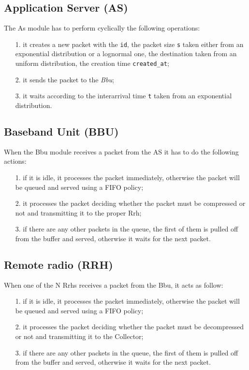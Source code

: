 \documentclass[11pt,a4paper,oneside, openright]{article}
\begin{document}
\subsection{Application Server (AS)}
The As module has to perform cyclically the following operations:
\begin{itemize}
    \item[1.] it creates a new packet with the \texttt{id}, the packet size \texttt{s} taken either from an exponential distribution or a lognormal one, the destination taken from an uniform distribution, the creation time \texttt{created\_at};
    \item[2.] it sends the packet to the \textit{Bbu};
    \item[3.] it waits according to the interarrival time \texttt{t} taken from an exponential distribution.
\end{itemize}

\subsection{Baseband Unit (BBU)}
When the Bbu module receives a packet from the AS it has to do the following actions:
\begin{itemize}
    \item[1.] if it is idle, it processes the packet immediately, otherwise the packet will be queued and served using a FIFO policy;
    \item[2.] it processes the packet deciding whether the packet must be compressed or not and transmitting it to the proper Rrh;
    \item[3.] if there are any other packets in the queue, the first of them is pulled off from the buffer and served, otherwise it waits for the next packet.
\end{itemize}

\subsection{Remote radio (RRH)}
When one of the N Rrhs receives a packet from the Bbu, it acts as follow:
\begin{itemize}
    \item[1.] if it is idle, it processes the packet immediately, otherwise the packet will be queued and served using a FIFO policy;
    \item[2.] it processes the packet deciding whether the packet must be decompressed or not and transmitting it to the Collector;
    \item[3.] if there are any other packets in the queue, the first of them is pulled off from the buffer and served, otherwise it waits for the next packet.
\end{itemize}
\end{document}
